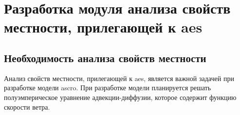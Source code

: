 \chapter{Разработка модуля анализа свойств местности, прилегающей к \ac{aes}}


\section{Необходимость анализа свойств местности}

Анализ свойств местности, прилегающей к \ac{aes}, является важной задачей при разработке модели \ac{ascro}. При 
разработке модели планируется решать полуэмперическое уравнение адвекции-диффузии, которое содержит функцию скорости 
ветра. 

